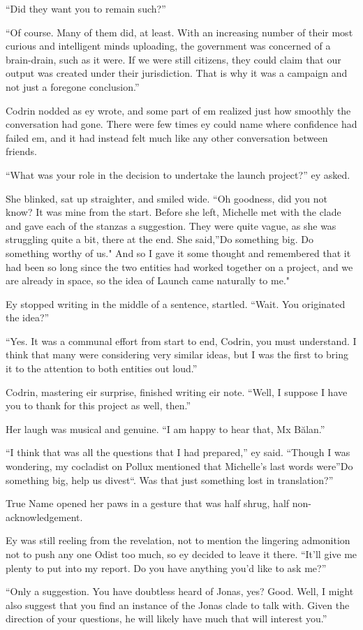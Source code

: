 ``Did they want you to remain such?''

``Of course. Many of them did, at least. With an increasing number of their most curious and intelligent minds uploading, the government was concerned of a brain-drain, such as it were. If we were still citizens, they could claim that our output was created under their jurisdiction. That is why it was a campaign and not just a foregone conclusion.''

Codrin nodded as ey wrote, and some part of em realized just how smoothly the conversation had gone. There were few times ey could name where confidence had failed em, and it had instead felt much like any other conversation between friends.

``What was your role in the decision to undertake the launch project?'' ey asked.

She blinked, sat up straighter, and smiled wide. ``Oh goodness, did you not know? It was mine from the start. Before she left, Michelle met with the clade and gave each of the stanzas a suggestion. They were quite vague, as she was struggling quite a bit, there at the end. She said,''Do something big. Do something worthy of us." And so I gave it some thought and remembered that it had been so long since the two entities had worked together on a project, and we are already in space, so the idea of Launch came naturally to me."

Ey stopped writing in the middle of a sentence, startled. ``Wait. You originated the idea?''

``Yes. It was a communal effort from start to end, Codrin, you must understand. I think that many were considering very similar ideas, but I was the first to bring it to the attention to both entities out loud.''

Codrin, mastering eir surprise, finished writing eir note. ``Well, I suppose I have you to thank for this project as well, then.''

Her laugh was musical and genuine. ``I am happy to hear that, Mx Bălan.''

``I think that was all the questions that I had prepared,'' ey said. ``Though I was wondering, my cocladist on Pollux mentioned that Michelle's last words were''Do something big, help us divest``. Was that just something lost in translation?''

True Name opened her paws in a gesture that was half shrug, half non-acknowledgement.

Ey was still reeling from the revelation, not to mention the lingering admonition not to push any one Odist too much, so ey decided to leave it there. ``It'll give me plenty to put into my report. Do you have anything you'd like to ask me?''

``Only a suggestion. You have doubtless heard of Jonas, yes? Good. Well, I might also suggest that you find an instance of the Jonas clade to talk with. Given the direction of your questions, he will likely have much that will interest you.''
